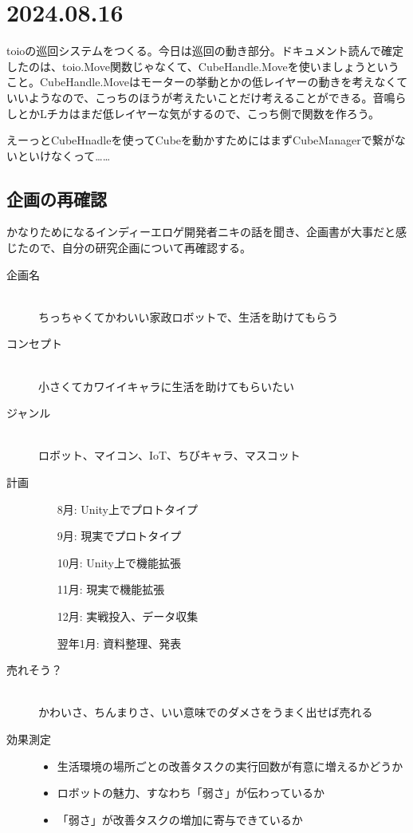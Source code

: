 \documentclass[fleqn,twocolumn]{mynote}
\begin{document}
  \section*{2024.08.16}
  toioの巡回システムをつくる。今日は巡回の動き部分。ドキュメント読んで確定したのは、toio.Move関数じゃなくて、CubeHandle.Moveを使いましょうということ。CubeHandle.Moveはモーターの挙動とかの低レイヤーの動きを考えなくていいようなので、こっちのほうが考えたいことだけ考えることができる。音鳴らしとかLチカはまだ低レイヤーな気がするので、こっち側で関数を作ろう。

  えーっとCubeHnadleを使ってCubeを動かすためにはまずCubeManagerで繋がないといけなくって……

  \subsection*{企画の再確認}
  かなりためになるインディーエロゲ開発者ニキの話を聞き、企画書が大事だと感じたので、自分の研究企画について再確認する。
  \begin{description}
    \item[企画名]\mbox{}\\
      ちっちゃくてかわいい家政ロボットで、生活を助けてもらう
    \item[コンセプト]\mbox{}\\
      小さくてカワイイキャラに生活を助けてもらいたい
    \item[ジャンル]\mbox{}\\
      ロボット、マイコン、IoT、ちびキャラ、マスコット
    \item[計画]\mbox{}
      \begin{itemize}
        \item[8月: ]Unity上でプロトタイプ
        \item[9月: ]現実でプロトタイプ
        \item[10月: ]Unity上で機能拡張
        \item[11月: ]現実で機能拡張
        \item[12月: ]実戦投入、データ収集
        \item[翌年1月: ]資料整理、発表
      \end{itemize}
    \item[売れそう？]\mbox{}\\
      かわいさ、ちんまりさ、いい意味でのダメさをうまく出せば売れる
    \item[効果測定]\mbox{}
      \begin{itemize}
        \item 生活環境の場所ごとの改善タスクの実行回数が有意に増えるかどうか
        \item ロボットの魅力、すなわち「弱さ」が伝わっているか
        \item 「弱さ」が改善タスクの増加に寄与できているか
      \end{itemize}
  \end{description}
\end{document}
